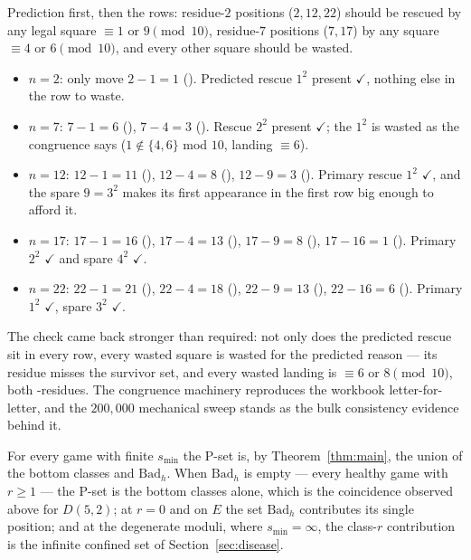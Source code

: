 \begin{remark}\label{rem:workbook}
Prediction first, then the rows: residue-$2$ positions ($2, 12, 22$)
should be rescued by any legal square $\equiv 1$ or $9 \pmod{10}$,
residue-$7$ positions ($7, 17$) by any square $\equiv 4$ or $6
\pmod{10}$, and every other square should be wasted.
\begin{itemize}[nosep]
\item $n = 2$: only move $2-1 = 1$ (\PP). Predicted rescue $1^2$ present
  $\checkmark$, nothing else in the row to waste.
\item $n = 7$: $7-1 = 6$ (\NN), $7-4 = 3$ (\PP). Rescue $2^2$ present
  $\checkmark$; the $1^2$ is wasted as the congruence says
  ($1 \notin \{4, 6\}$ mod $10$, landing $\equiv 6$).
\item $n = 12$: $12-1 = 11$ (\PP), $12-4 = 8$ (\NN), $12-9 = 3$ (\PP).
  Primary rescue $1^2$ $\checkmark$, and the spare $9 = 3^2$ makes its
  first appearance in the first row big enough to afford it.
\item $n = 17$: $17-1 = 16$ (\NN), $17-4 = 13$ (\PP), $17-9 = 8$ (\NN),
  $17-16 = 1$ (\PP). Primary $2^2$ $\checkmark$ and spare $4^2$
  $\checkmark$.
\item $n = 22$: $22-1 = 21$ (\PP), $22-4 = 18$ (\NN), $22-9 = 13$ (\PP),
  $22-16 = 6$ (\NN). Primary $1^2$ $\checkmark$, spare $3^2$
  $\checkmark$.
\end{itemize}
The check came back stronger than required: not only does the predicted
rescue sit in every row, every wasted square is wasted for the predicted
reason --- its residue misses the survivor set, and every wasted landing
is $\equiv 6$ or $8 \pmod{10}$, both \NN-residues. The congruence
machinery reproduces the workbook letter-for-letter, and the $200{,}000$
mechanical sweep stands as the bulk consistency evidence behind it.
\end{remark}

\begin{remark}\label{rem:coincidence}
For every game with finite $s_{\min}$ the P-set is, by
Theorem~\ref{thm:main}, the union of the bottom classes and
$\mathrm{Bad}_h$. When $\mathrm{Bad}_h$ is empty --- every healthy game
with $r \ge 1$ --- the P-set is the bottom classes alone, which is the
coincidence observed above for $D(5,2)$; at $r = 0$ and on $E$ the set
$\mathrm{Bad}_h$ contributes its single position; and at the degenerate
moduli, where $s_{\min} = \infty$, the class-$r$ contribution is the
infinite confined set of Section~\ref{sec:disease}.
\end{remark}

